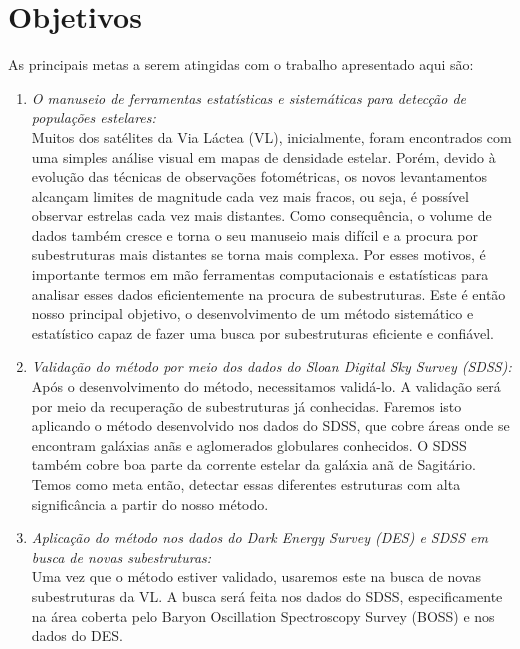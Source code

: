 \documentclass[
	12pt,				%
	openany,			%
	oneside,			%
	a4paper,			%
	english,			%
	brazil				%
	]{abntex2}
\begin{document}
\chapter*[Objetivos]{Objetivos}

%
As principais metas a serem atingidas com o trabalho apresentado aqui são: 
\begin{enumerate}
\item \emph{O manuseio de ferramentas estatísticas e sistemáticas para detecção de populações estelares:} \\
Muitos dos satélites da Via Láctea (VL), inicialmente,  foram encontrados com uma simples análise visual em mapas de densidade estelar. Porém, devido à evolução das técnicas de  observações fotométricas, os novos levantamentos alcançam limites de magnitude cada vez mais fracos, ou seja, é possível observar estrelas cada vez mais  distantes. Como consequência, o volume de dados também cresce e torna o seu manuseio mais difícil e a procura por subestruturas mais distantes se torna mais complexa. Por esses motivos, é importante termos em mão ferramentas computacionais e estatísticas para analisar esses dados eficientemente na procura de subestruturas. Este é então nosso principal objetivo, o desenvolvimento  de um método sistemático e estatístico capaz de fazer uma busca por subestruturas eficiente e confiável.  \\

\item \emph{Validação do método por meio dos dados do Sloan Digital Sky Survey (SDSS):} \\
Após o desenvolvimento do método, necessitamos validá-lo. A validação será por meio da recuperação de subestruturas já conhecidas. Faremos isto aplicando o método desenvolvido nos dados do SDSS, que cobre áreas onde se encontram galáxias anãs e aglomerados globulares conhecidos. O SDSS também cobre boa parte da corrente estelar da galáxia anã de Sagitário. Temos como meta então, detectar essas diferentes estruturas com alta significância a partir do nosso  método. \\

\item \emph{Aplicação do método nos dados do Dark Energy Survey (DES) e SDSS em busca de novas subestruturas:} \\
Uma vez que o método estiver validado, usaremos este na busca de novas subestruturas da VL. A busca será feita nos dados do SDSS, especificamente na área coberta pelo Baryon Oscillation Spectroscopy Survey (BOSS) e nos dados do DES.\\
 

\end{enumerate}
\end{document}
